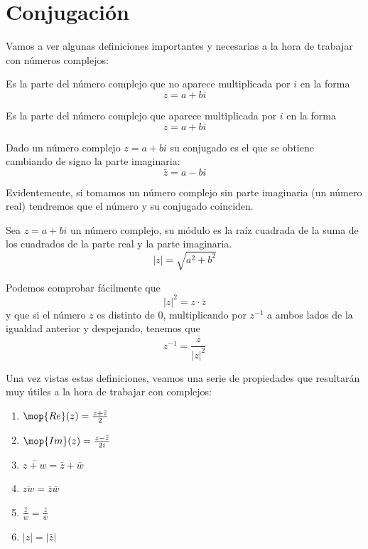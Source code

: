 \documentclass{apuntes}
\begin{document}
\section{Conjugación}
Vamos a ver algunas definiciones importantes y necesarias a la hora de trabajar con números complejos:

\begin{defn}
Es la parte del número complejo que no aparece multiplicada por $i$ en la forma
\[z = a + bi\]
\end{defn}

\begin{defn}
Es la parte del número complejo que aparece multiplicada por $i$ en la forma
\[z = a + bi\]
\end{defn}

\begin{defn}[Conjugado]
Dado un número complejo $z=a+bi$ su conjugado es el que se obtiene cambiando de signo la parte imaginaria:
\[\bar{z}=a-bi\]

Evidentemente, si tomamos un número complejo sin parte imaginaria (un número real) tendremos que el número y su conjugado coinciden.
\end{defn}

\begin{defn}[Módulo]
Sea $z=a+bi$ un número complejo, su módulo es la raíz cuadrada de la suma de los cuadrados de la parte real y la parte imaginaria.
\[|z|=\sqrt{a^2+b^2}\]

Podemos comprobar fácilmente que
\[|z|^2=z \cdot \overline{z}\]
y que si el número $z$ es distinto de 0, multiplicando por $z^{-1}$ a ambos lados de la igualdad anterior y despejando, tenemos que
\[z^{-1}=\frac{\overline{z}}{|z|^2}\]
\end{defn}

Una vez vistas estas definiciones, veamos una serie de propiedades que resultarán muy útiles a la hora de trabajar con complejos:
\begin{enumerate}
\item $\mop{Re}(z)=\frac{z+\bar{z}}{2}$
\item $\mop{Im}(z)=\frac{z-\bar{z}}{2i}$
\item $\overline{z+w}=\bar{z}+\bar{w}$
\item $\overline{zw}=\bar{z}\bar{w}$
\item $\overline{\frac{z}{w}}=\frac{\bar{z}}{\bar{w}}$
\item $|z|=|\bar{z}|$
\end{enumerate}
\end{document}
